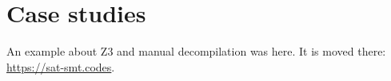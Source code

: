 \chapter{Case studies}












% 








%
%



An example about Z3 and manual decompilation was here.
It is moved there:
\url{https://sat-smt.codes}.

